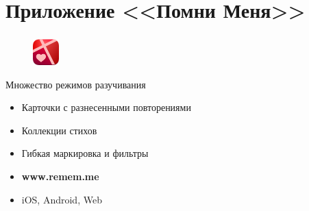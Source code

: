 \documentclass[t,aspectratio=169,14pt]{beamer}  %
\begin{document}
\section{Приложение <<Помни Меня>>}
\begin{frame}[c]
	\frametitle{\insertsection}
	\begin{figure}
		\begin{flushright}
		\vspace{-1.5cm}
		\includegraphics[width=1cm]{remember-me-logo}
	\end{flushright}
		\end{figure}

	 \begin{multicols}{2}
		Множество режимов разучивания %
		\begin{itemize}

			\item Карточки с разнесенными повторениями
			\item Коллекции стихов
			\item Гибкая маркировка и фильтры
			\item \textbf{www.remem.me}
			\item iOS, Android, Web
		\end{itemize}
		\begin{center}
			\begin{figure}
			

\end{figure}
\end{center}
\end{multicols}
\end{frame}
\end{document}
